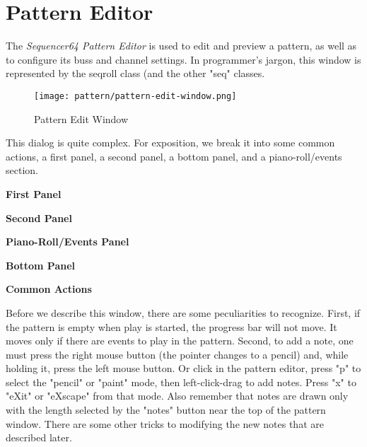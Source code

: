 %
%

\section{Pattern Editor}
\label{sec:seq64_pattern_editor}

   The \textsl{Sequencer64 Pattern Editor} is used to edit and preview a
   pattern, as well as to configure its buss and channel settings.
   In programmer's jargon, this window is represented by the seqroll class (and
   the other "seq" classes.

\begin{figure}[H]
   \centering 
   \texttt{[image: pattern/pattern-edit-window.png]}
   \caption{Pattern Edit Window}
   \label{fig:pattern_edit_window}
\end{figure}

   This dialog is quite complex.
   For exposition, we break it into some common actions, a first panel, a
   second panel, a bottom panel, and a piano-roll/events section.

   \begin{enumber}
      \item \textbf{First Panel}
      \item \textbf{Second Panel}
      \item \textbf{Piano-Roll/Events Panel}
      \item \textbf{Bottom Panel}
      \item \textbf{Common Actions}
   \end{enumber}

   Before we describe this window, there are some peculiarities to recognize.
   First, if the pattern is empty when play is started, the progress bar will
   not move.  It moves only if there are events to play in the pattern.
   Second, to add a note, one must press the right mouse button (the pointer
   changes to a pencil) and, while holding it, press the left mouse button.  Or
   click in the pattern editor, press
   "p" to select the "pencil" or "paint" mode, then
   left-click-drag to add notes.
   Press "x" to "eXit" or "eXscape" from that mode.  Also remember
   that notes are drawn only with the length selected by the "notes" button
   near the top of the pattern window.  There are some other tricks to
   modifying the new notes that are described later.

